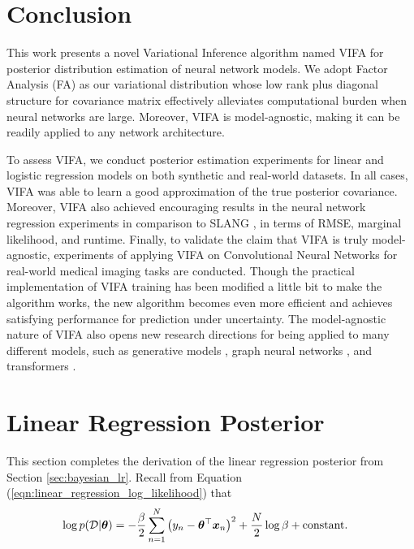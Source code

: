 \documentclass[10pt]{article} %
\begin{document}
\section{Conclusion}
\label{Conclusion}
 This work presents a novel Variational Inference algorithm named VIFA for posterior distribution estimation of neural network models. We adopt Factor Analysis (FA) as our variational distribution whose low rank plus diagonal structure for covariance matrix effectively alleviates computational burden when neural networks are large. Moreover, VIFA is model-agnostic, making it can be readily applied to any network architecture. 
 
To assess VIFA, we conduct posterior estimation experiments for linear and logistic regression models on both synthetic and real-world datasets. In all cases,
VIFA was able to learn a good approximation of the true posterior covariance. Moreover, VIFA also achieved encouraging results in the neural network regression experiments in comparison to SLANG \citep{mishkin2018}, in terms of RMSE, marginal likelihood, and runtime. Finally, to validate the claim that VIFA is truly model-agnostic, experiments of applying VIFA on Convolutional Neural Networks for real-world medical imaging tasks are conducted. Though the practical implementation of VIFA training has been modified a little bit to make the algorithm works, the new algorithm becomes even more efficient and achieves satisfying performance for prediction under uncertainty. The model-agnostic nature of VIFA also opens new research directions for being applied to many different models, such as generative models \citep{harshvardhan2020comprehensive}, graph neural networks \citep{wu2020comprehensive}, and transformers \citep{vaswani2017attention}. 
 





\appendix


\section{Linear Regression Posterior}
\label{app:bayesian_linear_regression_posterior}
 
This section completes the derivation of the linear regression posterior from Section \ref{sec:bayesian_lr}. Recall from Equation (\ref{eqn:linear_regression_log_likelihood}) that
\begin{align}
\begin{split}
    \log p(\mathcal{D} | {\bm{\theta}}) & = - \frac{\beta}{2} \sum_{n=1}^N \big(y_n - {\bm{\theta}}^\top {\bm{x}}_n \big)^2 + \frac{N}{2} \log \beta + \text{constant}.
\end{split}
\end{align}
\end{document}
